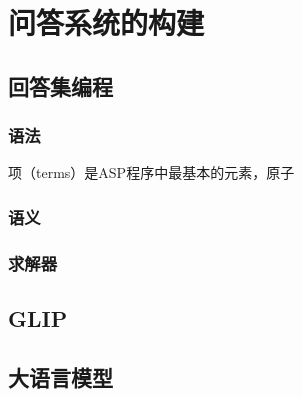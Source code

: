 \chapter{问答系统的构建}
\section{回答集编程}
\subsection{语法}
项（terms）是ASP程序中最基本的元素，原子
\subsection{语义}
\subsection{求解器}
\section{GLIP}
\section{大语言模型}